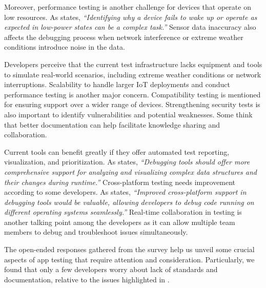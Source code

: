 \label{find:results6}

Moreover, performance testing is another challenge for devices that operate on low resources. As  states, \textit{``Identifying why a device fails to wake up or operate as expected in low-power states can be a complex task.''} Sensor data inaccuracy also affects the debugging process when network interference or extreme weather conditions introduce noise in the data.

\label{find:results7}


Developers perceive that the current test infrastructure lacks equipment and tools to simulate real-world scenarios, including extreme weather conditions or network interruptions. Scalability to handle larger IoT deployments and conduct performance testing is another major concern. Compatibility testing is mentioned for ensuring support over a wider range of devices. Strengthening security tests is also important to identify vulnerabilities and potential weaknesses. Some think that better documentation can help facilitate knowledge sharing and collaboration. 

Current tools can benefit greatly if they offer automated test reporting, visualization, and prioritization. As  states, \textit{``Debugging tools should offer more comprehensive support for analyzing and visualizing complex data structures and their changes during runtime.''} 
Cross-platform testing needs improvement according to some developers. As  states, \textit{``Improved cross-platform support in debugging tools would be valuable, allowing developers to debug code running on different operating systems seamlessly.''} Real-time collaboration in testing is another talking point among the developers as it can allow multiple team members to debug and troubleshoot issues simultaneously.

\label{find:results8}

The open-ended responses gathered from the survey help us unveil some crucial aspects of \iot app testing that require attention and consideration. 
Particularly, we found that only a few developers worry about lack of standards and documentation, relative to the issues highlighted in .


